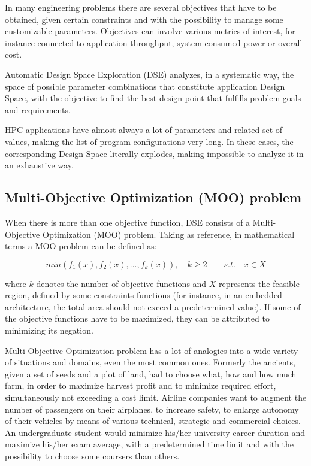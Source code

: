In many engineering problems there are several objectives that have to be obtained, given certain constraints and with the possibility to manage some customizable parameters. Objectives can involve various metrics of interest, for instance connected to application throughput, system consumed power or overall cost.

Automatic Design Space Exploration (DSE) analyzes, in a systematic way, the space of possible parameter combinations that constitute application Design Space, with the objective to find the best design point that fulfills problem goals and requirements.

HPC applications have almost always a lot of parameters and related set of values, making the list of program configurations very long. In these cases, the corresponding Design Space literally explodes, making impossible to analyze it in an exhaustive way.

\subsection{Multi-Objective Optimization (MOO) problem}

When there is more than one objective function, DSE consists of a Multi-Objective Optimization (MOO) problem. Taking \cite{caramia2008multi} as reference, in mathematical terms a MOO problem can be defined as:

\begin{equation}
        min( f_1(x), f_2(x), ..., f_k(x) ), \quad k \ge 2 \qquad s.t. \quad x \in X
\end{equation}

where $k$ denotes the number of objective functions and $X$ represents the feasible region, defined by some constraints functions (for instance, in an embedded architecture, the total area should not exceed a predetermined value). If some of the objective functions have to be maximized, they can be attributed to minimizing its negation.

Multi-Objective Optimization problem has a lot of analogies into a wide variety of situations and domains, even the most common ones. Formerly the ancients, given a set of seeds and a plot of land, had to choose what, how and how much farm, in order to maximize harvest profit and to minimize required effort, simultaneously not exceeding a cost limit. Airline companies want to augment the number of passengers on their airplanes, to increase safety, to enlarge autonomy of their vehicles by means of various technical, strategic and commercial choices. An undergraduate student would minimize his/her university career duration and maximize his/her exam average, with a predetermined time limit and with the possibility to choose some coursers than others.


